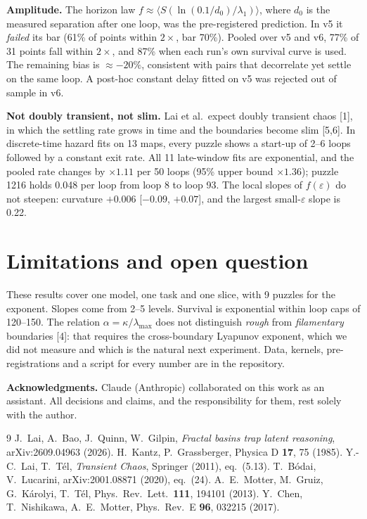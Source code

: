 \documentclass[10pt,twocolumn]{article}
\begin{document}
\textbf{Amplitude.} The horizon law $f\approx\langle S(\ln(0.1/d_0)/\lambda_1)\rangle$, where $d_0$ is the measured
separation after one loop, was the pre-registered prediction. In v5 it \emph{failed} its bar (61\% of points within
$2\times$, bar 70\%). Pooled over v5 and v6, 77\% of 31 points fall within $2\times$, and 87\% when each run's own
survival curve is used. The remaining bias is $\approx-20\%$, consistent with pairs that decorrelate yet settle on the
same loop. A post-hoc constant delay fitted on v5 was rejected out of sample in v6.

\textbf{Not doubly transient, not slim.} Lai et al.\ expect doubly transient chaos [1], in which the settling rate grows
in time and the boundaries become slim [5,6]. In discrete-time hazard fits on 13 maps, every puzzle shows a start-up of
2--6 loops followed by a constant exit rate. All 11 late-window fits are exponential, and the pooled rate changes by
$\times1.11$ per 50 loops (95\% upper bound $\times1.36$); puzzle 1216 holds 0.048 per loop from loop 8 to loop 93. The
local slopes of $f(\varepsilon)$ do not steepen: curvature $+0.006$ [$-0.09$, $+0.07$], and the largest small-$\varepsilon$
slope is 0.22.


\section{Limitations and open question}
These results cover one model, one task and one slice, with 9 puzzles for the exponent. Slopes come from 2--5 levels.
Survival is exponential within loop caps of 120--150. The relation $\alpha=\kappa/\lambda_{\max}$ does not distinguish
\emph{rough} from \emph{filamentary} boundaries [4]: that requires the cross-boundary Lyapunov exponent, which we did
not measure and which is the natural next experiment. Data, kernels, pre-registrations and a script for every number
are in the repository.

\small
\noindent\textbf{Acknowledgments.} Claude (Anthropic) collaborated on this work as an assistant. All decisions and
claims, and the responsibility for them, rest solely with the author.

\begin{thebibliography}{9}\setlength{\itemsep}{0pt}
 J.~Lai, A.~Bao, J.~Quinn, W.~Gilpin, \emph{Fractal basins trap latent reasoning}, arXiv:2609.04963 (2026).
 H.~Kantz, P.~Grassberger, Physica D \textbf{17}, 75 (1985).
 Y.-C.~Lai, T.~T\'el, \emph{Transient Chaos}, Springer (2011), eq.~(5.13).
 T.~B\'odai, V.~Lucarini, arXiv:2001.08871 (2020), eq.~(24).
 A.~E.~Motter, M.~Gruiz, G.~K\'arolyi, T.~T\'el, Phys.\ Rev.\ Lett.\ \textbf{111}, 194101 (2013).
 Y.~Chen, T.~Nishikawa, A.~E.~Motter, Phys.\ Rev.\ E \textbf{96}, 032215 (2017).
\end{thebibliography}
\end{document}

